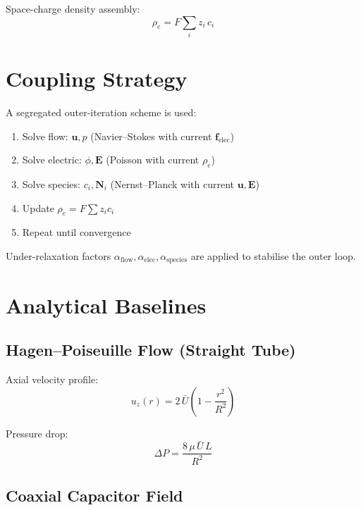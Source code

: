 \documentclass[11pt,a4paper]{article}
\begin{document}
Space-charge density assembly:
\begin{equation}
  \rho_{e} = F\sum_{i} z_{i}\,c_{i}
\end{equation}

\section{Coupling Strategy}

A segregated outer-iteration scheme is used:
\begin{enumerate}
  \item Solve flow: $\bm{u}, p$ (Navier--Stokes with current $\bm{f}_{\mathrm{elec}}$)
  \item Solve electric: $\phi, \bm{E}$ (Poisson with current $\rho_e$)
  \item Solve species: $c_i, \bm{N}_i$ (Nernst--Planck with current $\bm{u}, \bm{E}$)
  \item Update $\rho_e = F\sum z_i c_i$
  \item Repeat until convergence
\end{enumerate}

Under-relaxation factors $\alpha_{\mathrm{flow}}, \alpha_{\mathrm{elec}},
\alpha_{\mathrm{species}}$ are applied to stabilise the outer loop.

\section{Analytical Baselines}

\subsection{Hagen--Poiseuille Flow (Straight Tube)}

Axial velocity profile:
\begin{equation}
  u_z(r) = 2\,\bar{U}\!\left(1 - \frac{r^2}{R^2}\right)
\end{equation}

Pressure drop:
\begin{equation}
  \Delta P = \frac{8\,\mu\,\bar{U}\,L}{R^2}
\end{equation}

\subsection{Coaxial Capacitor Field}
\end{document}
